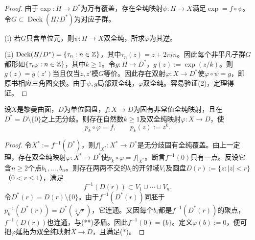 \begin{proof}
由于$\exp:H\to D^*$为万有覆盖，存在全纯映射$\psi:H\to X$满足$\exp=f\circ\psi$。令$G\subset\operatorname{Deck}(H/D^*)$为对应子群。

(i) 若$G$只含单位元，则$\psi:H\to X$双全纯，所求$\varphi$为其逆。

(ii) $\operatorname{Deck}(H/D^*)=\{\tau_n:n\in\mathbb Z\}$，其中$\tau_n(z)=z+2\pi in$。因此每个非平凡子群$G$都形如$\{\tau_{nk}:n\in\mathbb Z\}$，其中$k\ge1$。令$g:H\to D^*$，$g(z):=\exp(z/k)$。则$g(z)=g(z')$当且仅当$z,z'$模$G$等价。因此存在双射$\varphi:X\to D^*$使$\varphi\circ\psi=g$，即原书相应三角图交换。由于$\psi,g$局部双全纯，$\varphi$双全纯。容易验证(2)，定理得证。
\end{proof}
设$X$是黎曼曲面，$D$为单位圆盘，$f:X\to D$为固有非常值全纯映射，且在$D^*=D\setminus\{0\}$之上无分歧。则存在自然数$k\ge1$及双全纯映射$\varphi:X\to D$，使
\begin{equation}p_k\circ\varphi=f,\qquad p_k(z):=z^k.\tag{*}\end{equation}
\begin{proof}
令$X^*:=f^{-1}(D^*)$，则$f|_{X^*}:X^*\to D^*$是无分歧固有全纯覆盖。由上一定理，存在双全纯映射$\varphi:X^*\to D^*$使$p_k\circ\varphi=f|_{X^*}$。断言$f^{-1}(0)$只有一点。反设它含$n\ge2$个点$b_1,\ldots,b_n$。则存在两两不交的$b_i$的开邻域$V_i$及圆盘$D(r):=\{z:|z|<r\}$（$0<r\le1$），满足
\begin{equation}f^{-1}(D(r))\subset V_1\cup\cdots\cup V_n.\tag{**}\end{equation}
令$D^*(r)=D(r)\setminus\{0\}$。由于$f^{-1}(D^*(r))$同胚于$p_k^{-1}(D^*(r))=D^*(\sqrt[k]r)$，它连通。又因每个$b_i$都是$f^{-1}(D^*(r))$的聚点，$f^{-1}(D(r))$也连通，与(**)矛盾。因此$f^{-1}(0)=\{b\}$。定义$\varphi(b):=0$，便可把$\varphi$延拓为双全纯映射$X\to D$，且满足(*)。
\end{proof}
